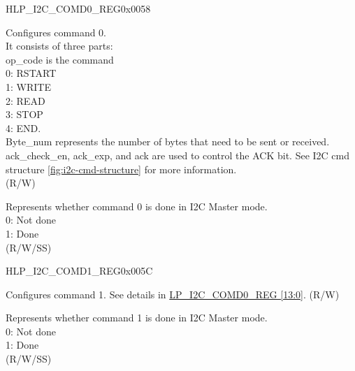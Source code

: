     
    \begin{register}{H}{LP\_I2C\_COMD0\_REG}{0x0058}\label{regdesc:LPI2CCOMD0REG}
    \regnewline%
    \begin{regdesc}\begin{reglist}
    \label{fielddesc:LPI2CCOMMAND0}\item [LP\_I2C\_COMMAND0] Configures command 0. \\
It consists of three parts:\\ 
op\_code is the command\\
0: RSTART\\ 
1: WRITE\\
2: READ\\
3: STOP\\
4: END.\\
Byte\_num represents the number of bytes that need to be sent or received.\\
ack\_check\_en, ack\_exp, and ack are used to control the ACK bit. See I2C cmd structure \ref{fig:i2c-cmd-structure} for more information. \\(R/W)
    \label{fielddesc:LPI2CCOMMAND0DONE}\item [LP\_I2C\_COMMAND0\_DONE] Represents whether command 0 is done in I2C Master mode.\\
0: Not done \\
1: Done \\ (R/W/SS)
    \end{reglist}\end{regdesc}
    \end{register}
    
    
    \begin{register}{H}{LP\_I2C\_COMD1\_REG}{0x005C}\label{regdesc:LPI2CCOMD1REG}
    \regnewline%
    \begin{regdesc}\begin{reglist}
    \label{fielddesc:LPI2CCOMMAND1}\item [LP\_I2C\_COMMAND1] Configures command 1. See details in \hyperref[regdesc:LPI2CCOMD0REG]{LP\_I2C\_COMD0\_REG [13:0]}. (R/W)
    \label{fielddesc:LPI2CCOMMAND1DONE}\item [LP\_I2C\_COMMAND1\_DONE] Represents whether command 1 is done in I2C Master mode.\\
0: Not done \\
1: Done \\ (R/W/SS)
    \end{reglist}\end{regdesc}
    \end{register}
    

